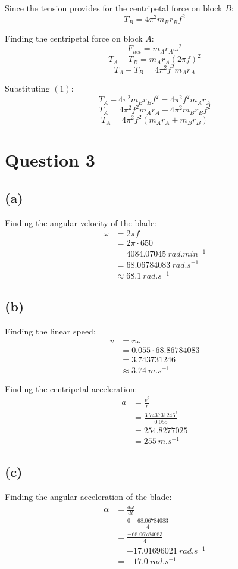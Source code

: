 \documentclass[11pt]{article}
\begin{document}
Since the tension provides for the centripetal force on block \(B\):
\[T_B = 4 \pi^2 m_B r_B f^2 \tag{1}\]

Finding the centripetal force on block \(A\):
\[F_{net} = m_A r_A \omega^2\]
\[T_A - T_B = m_A r_A (2 \pi f)^2\]
\[T_A - T_B = 4 \pi^2 f^2 m_A r_A\]

Substituting \((1)\):
\[T_A - 4 \pi^2 m_B r_B f^2 = 4 \pi^2 f^2 m_A r_A\]
\[T_A = 4 \pi^2 f^2 m_A r_A + 4 \pi^2 m_B r_B f^2\]
\[T_A = 4 \pi^2 f^2 (m_A r_A + m_B r_B)\]


\section{Question 3}
\label{sec:org06c658f}

\subsection{(a)}
\label{sec:orgdbb2d22}

Finding the angular velocity of the blade:
\begin{align*}
\omega &= 2 \pi f \\
&= 2 \pi \cdot 650 \\
&= \qty{4084.07045}{\unit{rad.min^{-1}}} \\
&= \qty{68.06784083}{\unit{rad.s^{-1}}} \\
&\approx \qty{68.1}{\unit{rad.s^{-1}}}
\end{align*}

\subsection{(b)}
\label{sec:org4b5bb49}
Finding the linear speed:
\begin{align*}
v &= r \omega \\
&= 0.055 \cdot 68.86784083 \\
&= 3.743731246 \\
&\approx \qty{3.74}{\unit{m.s^{-1}}}
\end{align*}

Finding the centripetal acceleration:
\begin{align*}
a &= \frac{v^2}{r} \\
&= \frac{3.743731246^2}{0.055} \\
&= 254.8277025 \\
&= \qty{255}{\unit{m.s^{-1}}}
\end{align*}

\subsection{(c)}
\label{sec:orgaf743e4}
Finding the angular acceleration of the blade:
\begin{align*}
\alpha &= \frac{d \omega}{dt} \\
&= \frac{0 - 68.06784083}{4} \\
&= \frac{- 68.06784083}{4} \\
&= -\qty{17.01696021}{\unit{rad.s^{-1}}} \\
&= -\qty{17.0}{\unit{rad.s^{-1}}}
\end{align*}
\end{document}
